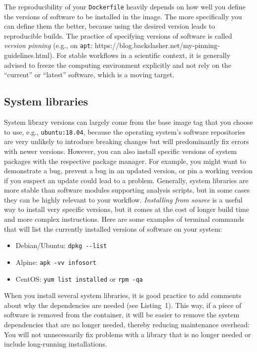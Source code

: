 \documentclass[10pt,letterpaper]{article}
\providecommand{\tightlist}{%
  \setlength{\itemsep}{0pt}\setlength{\parskip}{0pt}}
\begin{document}
  \label{rule:pinning} 

The reproducibility of your \texttt{Dockerfile} heavily depends on how
well you define the versions of software to be installed in the image.
The more specifically you can define them the better, because using the
desired version leads to reproducible builds. The practice of specifying
versions of software is called \emph{version pinning} (e.g., on
\texttt{apt}: https://blog.backslasher.net/my-pinning-guidelines.html).
For stable workflows in a scientific context, it is generally advised to
freeze the computing environment explicitly and not rely on the
``current'' or ``latest'' software, which is a moving target.

\hypertarget{system-libraries}{%
\subsection{System libraries}\label{system-libraries}}

System library versions can largely come from the base image tag that
you choose to use, e.g., \texttt{ubuntu:18.04}, because the operating
system's software repositories are very unlikely to introduce breaking
changes but will predominantly fix errors with newer versions. However,
you can also install specific versions of system packages with the
respective package manager. For example, you might want to demonstrate a
bug, prevent a bug in an updated version, or pin a working version if
you suspect an update could lead to a problem. Generally, system
libraries are more stable than software modules supporting analysis
scripts, but in some cases they can be highly relevant to your workflow.
\emph{Installing from source} is a useful way to install very specific
versions, but it comes at the cost of longer build time and more complex
instructions. Here are some examples of terminal commands that will list
the currently installed versions of software on your system:

\begin{itemize}
\tightlist
\item
  Debian/Ubuntu: \texttt{dpkg\ -\/-list}
\item
  Alpine: \texttt{apk\ -vv\ info\textbar{}sort}
\item
  CentOS: \texttt{yum\ list\ installed} or \texttt{rpm\ -qa}
\end{itemize}

When you install several system libraries, it is good practice to add
comments about why the dependencies are needed (see Listing~1). This
way, if a piece of software is removed from the container, it will be
easier to remove the system dependencies that are no longer needed,
thereby reducing maintenance overhead: You will not unnecessarily fix
problems with a library that is no longer needed or include long-running
installations.
\end{document}
